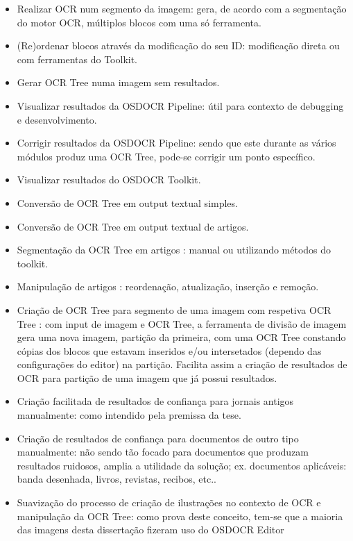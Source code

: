 \begin{itemize}
	\item Realizar OCR num segmento da imagem: gera, de acordo com a segmentação do motor OCR, múltiplos blocos com uma só ferramenta.
	\item (Re)ordenar blocos através da modificação do seu ID: modificação direta ou com ferramentas do Toolkit.
	
	\item Gerar OCR Tree numa imagem sem resultados.
	\item Visualizar resultados da OSDOCR Pipeline: útil para contexto de debugging e desenvolvimento.
	
	\item Corrigir resultados da OSDOCR Pipeline: sendo que este durante as vários módulos produz uma OCR Tree, pode-se corrigir um ponto específico.
	\item Visualizar resultados do OSDOCR Toolkit.
	
	\item Conversão de  OCR Tree em output textual simples.
	
	\item Conversão de OCR Tree em output textual de artigos.
	
	\item Segmentação da OCR Tree em artigos : manual ou utilizando métodos do toolkit.
	
	\item Manipulação de artigos : reordenação, atualização, inserção e remoção.
	
	\item Criação de OCR Tree para segmento de uma imagem com respetiva OCR Tree : com input de imagem e OCR Tree, a ferramenta de divisão de imagem gera uma nova imagem, partição da primeira, com uma OCR Tree constando cópias dos blocos que estavam inseridos e/ou intersetados (dependo das configurações do editor) na partição. Facilita assim a criação de resultados de OCR para partição de uma imagem que já possui resultados.
	
	\item Criação facilitada de resultados de confiança para jornais antigos manualmente: como intendido pela premissa da tese.
	
	\item Criação de resultados de confiança para documentos de outro tipo manualmente: não sendo tão focado para documentos que produzam resultados ruidosos, amplia a utilidade da solução; ex. documentos aplicáveis: banda desenhada, livros, revistas, recibos, etc..
	
	\item Suavização do processo de criação de ilustrações no contexto de OCR e manipulação da OCR Tree: como prova deste conceito, tem-se que a maioria das imagens desta dissertação fizeram uso do OSDOCR Editor
\end{itemize}

